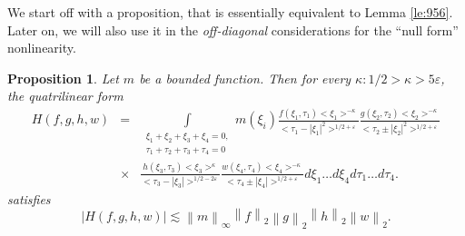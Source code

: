 \documentclass[draft,11pt,leqno]{amsart}
\newtheorem{proposition}{Proposition}
\newcommand{\norm}[2]{{\left\| #1 \right\|}_{#2}}
\newcommand{\ve}{\varepsilon}
\newcommand{\ka}{\kappa}
\newcommand{\intl}{\int\limits}
\newcommand{\f}{\displaystyle\frac}
\begin{document}
\vspace{.5cm}

We start off with a proposition, that is essentially equivalent to 
Lemma \ref{le:956}.
Later on, we  will also use it in the {\it off-diagonal} 
considerations for the 
``null form'' nonlinearity.
\begin{proposition}
\label{prop:lpk}
Let $m$ be a bounded function. Then for every $\ka:1/2>\ka>5\ve$, 
the quatrilinear form 
\begin{eqnarray*}
H(f,g,h,w)&=&\intl_{\begin{array}{l}\xi_1+\xi_2+\xi_3+\xi_4=0, \\
\tau_1+\tau_2+\tau_3+\tau_4=0
\end{array}}
m(\xi_i) \f{f(\xi_1,\tau_1)<\xi_1>^{-\ka}}{<\tau_1-|\xi_1|^2>^
{1/2+\ve}} \f{g(\xi_2,\tau_2)<\xi_2>^{-\ka}}{<\tau_2\pm |\xi_2|^2>^{1/2+\ve}} \\
&\times & 
\f{h(\xi_3,\tau_3)<\xi_3>^{\ka}}{<\tau_3-|\xi_3|>^{1/2-2\ve}}
\f{w(\xi_4,\tau_4)<\xi_4>^{-\ka}}{<\tau_4\pm|\xi_4|>^{1/2+\ve}}
d\xi_1\ldots d\xi_4 d\tau_1\ldots d\tau_4.
\end{eqnarray*}
satisfies
$$
|H(f,g,h,w)|\lesssim \norm{m}{\infty}
\norm{f}{2}\norm{g}{2}\norm{h}{2}\norm{w}{2}.
$$
\end{proposition}
\end{document}
